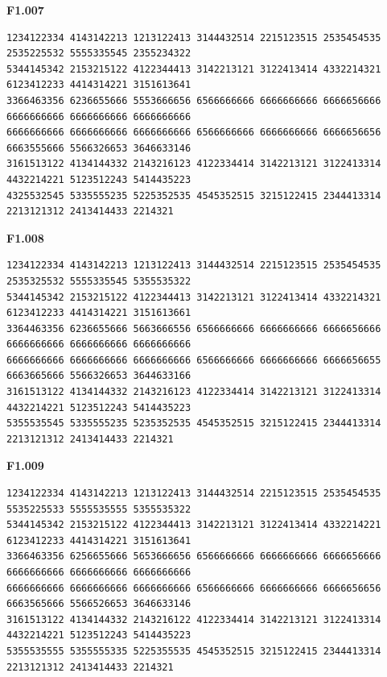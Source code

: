 \noindent\begin{minipage}{\linewidth}\textbf{F1.007}
\begin{lstlisting}
1234122334 4143142213 1213122413 3144432514 2215123515 2535454535 2535225532 5555335545 2355234322
5344145342 2153215122 4122344413 3142213121 3122413414 4332214321 6123412233 4414314221 3151613641
3366463356 6236655666 5553666656 6566666666 6666666666 6666656666 6666666666 6666666666 6666666666
6666666666 6666666666 6666666666 6566666666 6666666666 6666656656 6663555666 5566326653 3646633146
3161513122 4134144332 2143216123 4122334414 3142213121 3122413314 4432214221 5123512243 5414435223
4325532545 5335555235 5225352535 4545352515 3215122415 2344413314 2213121312 2413414433 2214321
\end{lstlisting}
\end{minipage}\par\smallskip

\noindent\begin{minipage}{\linewidth}\textbf{F1.008}
\begin{lstlisting}
1234122334 4143142213 1213122413 3144432514 2215123515 2535454535 2535325532 5555335545 5355535322
5344145342 2153215122 4122344413 3142213121 3122413414 4332214321 6123412233 4414314221 3151613661
3364463356 6236655666 5663666556 6566666666 6666666666 6666656666 6666666666 6666666666 6666666666
6666666666 6666666666 6666666666 6566666666 6666666666 6666656655 6663665666 5566326653 3644633166
3161513122 4134144332 2143216123 4122334414 3142213121 3122413314 4432214221 5123512243 5414435223
5355535545 5335555235 5235352535 4545352515 3215122415 2344413314 2213121312 2413414433 2214321
\end{lstlisting}
\end{minipage}\par\smallskip

\noindent\begin{minipage}{\linewidth}\textbf{F1.009}
\begin{lstlisting}
1234122334 4143142213 1213122413 3144432514 2215123515 2535454535 5535225533 5555535555 5355535322
5344145342 2153215122 4122344413 3142213121 3122413414 4332214221 6123412233 4414314221 3151613641
3366463356 6256655666 5653666656 6566666666 6666666666 6666656666 6666666666 6666666666 6666666666
6666666666 6666666666 6666666666 6566666666 6666666666 6666656656 6663565666 5566526653 3646633146
3161513122 4134144332 2143216122 4122334414 3142213121 3122413314 4432214221 5123512243 5414435223
5355535555 5355555335 5225355535 4545352515 3215122415 2344413314 2213121312 2413414433 2214321
\end{lstlisting}
\end{minipage}\par\smallskip

